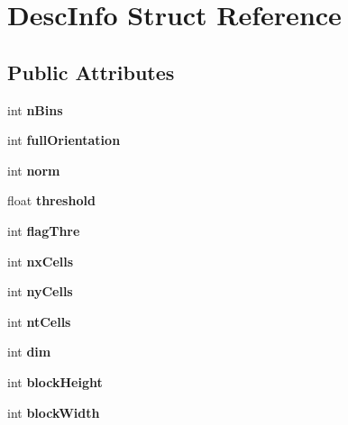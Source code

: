 \hypertarget{struct_desc_info}{
\section{DescInfo Struct Reference}
\label{struct_desc_info}
}
\subsection*{Public Attributes}
\begin{DoxyCompactItemize}
\item 
\hypertarget{struct_desc_info_a2bde776874112f43d29da2d9f41a1e59}{
int {\bfseries nBins}}
\label{struct_desc_info_a2bde776874112f43d29da2d9f41a1e59}

\item 
\hypertarget{struct_desc_info_ab00ec8cdbb9598a04500e15552592501}{
int {\bfseries fullOrientation}}
\label{struct_desc_info_ab00ec8cdbb9598a04500e15552592501}

\item 
\hypertarget{struct_desc_info_a94073a31c0d1ccc2e32eb43b3fba53a6}{
int {\bfseries norm}}
\label{struct_desc_info_a94073a31c0d1ccc2e32eb43b3fba53a6}

\item 
\hypertarget{struct_desc_info_ac4bb609af47b1d4a64ec94802a1a1d47}{
float {\bfseries threshold}}
\label{struct_desc_info_ac4bb609af47b1d4a64ec94802a1a1d47}

\item 
\hypertarget{struct_desc_info_a916fd10933019e4ba8b790a6dda3ff7c}{
int {\bfseries flagThre}}
\label{struct_desc_info_a916fd10933019e4ba8b790a6dda3ff7c}

\item 
\hypertarget{struct_desc_info_ab00ff5d070ae53d16577e8578d624c7e}{
int {\bfseries nxCells}}
\label{struct_desc_info_ab00ff5d070ae53d16577e8578d624c7e}

\item 
\hypertarget{struct_desc_info_a303f14d681cfc8a65d95d05c5ba77e52}{
int {\bfseries nyCells}}
\label{struct_desc_info_a303f14d681cfc8a65d95d05c5ba77e52}

\item 
\hypertarget{struct_desc_info_a2b010679bbd0b353d53164c5cea4fa8e}{
int {\bfseries ntCells}}
\label{struct_desc_info_a2b010679bbd0b353d53164c5cea4fa8e}

\item 
\hypertarget{struct_desc_info_a3374342a9cc783399c62ec2f36fc7b6e}{
int {\bfseries dim}}
\label{struct_desc_info_a3374342a9cc783399c62ec2f36fc7b6e}

\item 
\hypertarget{struct_desc_info_a4a647d259345fd52960f0f7f964f136e}{
int {\bfseries blockHeight}}
\label{struct_desc_info_a4a647d259345fd52960f0f7f964f136e}

\item 
\hypertarget{struct_desc_info_a946e080438c73b31f3d9038ab7cb9173}{
int {\bfseries blockWidth}}
\label{struct_desc_info_a946e080438c73b31f3d9038ab7cb9173}

\end{DoxyCompactItemize}


